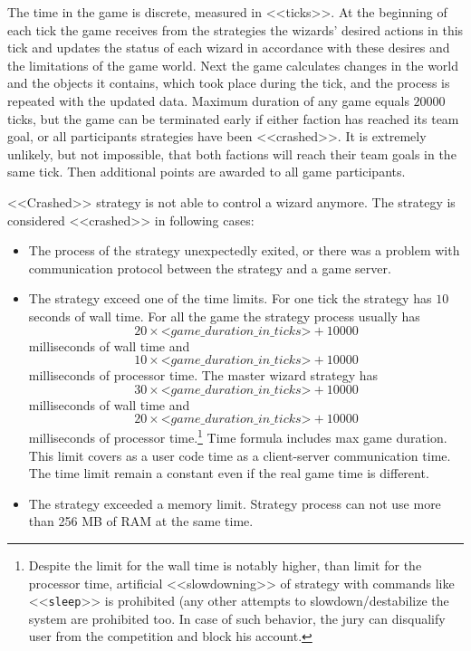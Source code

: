 The time in the game is discrete, measured in <<ticks>>. At the beginning of each tick the game receives from the strategies the wizards’ desired actions in this tick
and updates the status of each wizard in accordance with these desires and the limitations of the game world. Next the game calculates changes in the world and the objects it
contains, which took place during the tick, and the process is repeated with the updated data. Maximum duration of any game equals $20000$ ticks, but the game
can be terminated early if either faction has reached its team goal, or all participants strategies have been <<crashed>>. It is extremely
unlikely, but not impossible, that both factions will reach their team goals in the same tick. Then additional points
are awarded to all game participants.

<<Crashed>> strategy is not able to control a wizard anymore. The strategy is considered <<crashed>> in following cases: 
\begin{itemize}
  \item The process of the strategy unexpectedly exited, or there was a problem with communication protocol between the strategy and a game server. 
  \item The strategy exceed one of the time limits.
For one tick the strategy has $10$ seconds of wall time. For all the game the strategy process usually has
        \begin{equation}
        20\times\textit{<game\_duration\_in\_ticks>}+10000
        \end{equation}
        milliseconds of wall time and
        \begin{equation}
        10\times\textit{<game\_duration\_in\_ticks>}+10000
        \end{equation}
        milliseconds of processor time. The master wizard strategy has
        \begin{equation}
        30\times\textit{<game\_duration\_in\_ticks>}+10000
        \end{equation}
        milliseconds of wall time and
        \begin{equation}
        20\times\textit{<game\_duration\_in\_ticks>}+10000
        \end{equation}
        milliseconds of processor time.\footnote[3]{Despite the limit for the wall time is notably higher, than limit for the processor time,
        artificial <<slowdowning>> of strategy with commands like <<\texttt{sleep}>> is prohibited (any  other attempts to slowdown/destabilize
        the system are prohibited too. In case of such behavior, the jury can disqualify user from the competition and block his account.}
        Time formula includes max game duration. This limit covers as a user code time as a client-server communication time.
        The time limit remain a constant even if the real game time is different.
  \item The strategy exceeded a memory limit. Strategy process can not use more than 256 MB of RAM at the same time.
\end{itemize}

